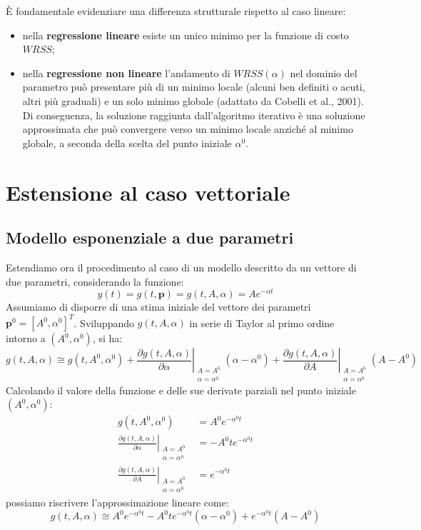 È fondamentale evidenziare una differenza strutturale rispetto al caso lineare:
\begin{itemize}
    \item nella \textbf{regressione lineare} esiste un unico minimo per la funzione di costo $WRSS$;
    \item nella \textbf{regressione non lineare} l'andamento di $WRSS(\alpha)$ nel dominio del parametro può presentare più di un minimo locale (alcuni ben definiti o acuti, altri più graduali) e un solo minimo globale (adattato da Cobelli et al., 2001). Di conseguenza, la soluzione raggiunta dall'algoritmo iterativo è una soluzione approssimata che può convergere verso un minimo locale anziché al minimo globale, a seconda della scelta del punto iniziale $\alpha^{0}$.
\end{itemize}

\section{Estensione al caso vettoriale}

\subsection{Modello esponenziale a due parametri}

Estendiamo ora il procedimento al caso di un modello descritto da un vettore di due parametri, considerando la funzione:
\begin{equation}
y(t) = g(t, \mathbf{p}) = g(t, A, \alpha) = A e^{-\alpha t}
\end{equation}
Assumiamo di disporre di una stima iniziale del vettore dei parametri $\mathbf{p}^{0} = [A^{0}, \alpha^{0}]^{T}$. Sviluppando $g(t, A, \alpha)$ in serie di Taylor al primo ordine intorno a $(A^{0}, \alpha^{0})$, si ha:
\begin{equation}
g(t, A, \alpha) \cong g(t, A^{0}, \alpha^{0}) + \left.\frac{\partial g(t, A, \alpha)}{\partial \alpha}\right|_{\substack{A=A^{0} \\ \alpha=\alpha^{0}}} (\alpha - \alpha^{0}) + \left.\frac{\partial g(t, A, \alpha)}{\partial A}\right|_{\substack{A=A^{0} \\ \alpha=\alpha^{0}}} (A - A^{0})
\end{equation}
Calcolando il valore della funzione e delle sue derivate parziali nel punto iniziale $(A^{0}, \alpha^{0})$:
\begin{align}
g(t, A^{0}, \alpha^{0}) &= A^{0} e^{-\alpha^{0} t} \\
\left.\frac{\partial g(t, A, \alpha)}{\partial \alpha}\right|_{\substack{A=A^{0} \\ \alpha=\alpha^{0}}} &= -A^{0} t e^{-\alpha^{0} t} \\
\left.\frac{\partial g(t, A, \alpha)}{\partial A}\right|_{\substack{A=A^{0} \\ \alpha=\alpha^{0}}} &= e^{-\alpha^{0} t}
\end{align}
possiamo riscrivere l'approssimazione lineare come:
\begin{equation}
g(t, A, \alpha) \cong A^{0} e^{-\alpha^{0} t} - A^{0} t e^{-\alpha^{0} t} (\alpha - \alpha^{0}) + e^{-\alpha^{0} t} (A - A^{0})
\end{equation}

